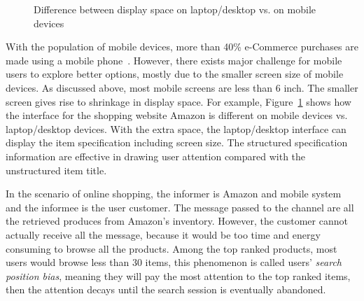 \begin{figure}[h]
    \centering
    \hfill
    \caption{Difference between display space on laptop/desktop vs. on mobile devices\label{fig:ch1:interface}}
\end{figure}

With the population of mobile devices, more than 40\% e-Commerce purchases are made using a mobile phone~\cite{mobileecom}. However, there exists major challenge for mobile users to explore better options, mostly due to the smaller screen size of mobile devices. As discussed above, most mobile screens are less than 6 inch. The smaller screen gives rise to shrinkage in display space. For example, Figure~\ref{fig:ch1:interface} shows how the interface for the shopping website Amazon is different on mobile devices vs. laptop/desktop devices. With the extra space, the laptop/desktop interface can display the item specification including screen size. The structured specification information are effective in drawing user attention compared with the unstructured item title. 

In the scenario of online shopping, the informer is Amazon and mobile system and the informee is the user customer. The message passed to the channel are all the retrieved produces from Amazon's inventory. However, the customer cannot actually receive all the message, because it would be too time and energy consuming to browse all the products. Among the top ranked products, most users would browse less than 30 items, this phenomenon is called users' \textit{search position bias}, meaning they will pay the most attention to the top ranked items, then the attention decays until the search session is eventually abandoned.

